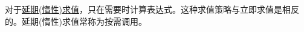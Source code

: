 对于\href{https://en.wikipedia.org/wiki/Lazy_evaluation}{延期(惰性)求值}，只在需要时计算表达式。这种求值策略与立即求值是相反的。延期(惰性)求值常称为按需调用。